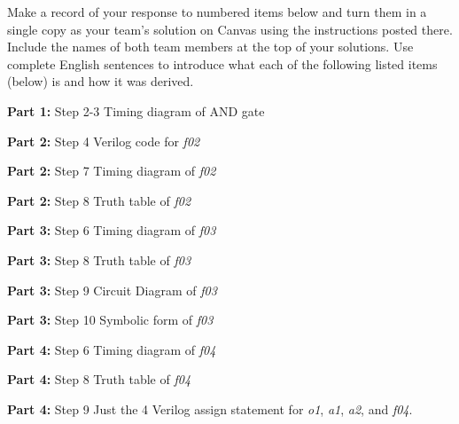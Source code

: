 \documentclass[
]{article}
\begin{document}
Make a record of your response to numbered items below and turn them in
a single copy as your team's solution on Canvas using the instructions
posted there. Include the names of both team members at the top of your
solutions. Use complete English sentences to introduce what each of the
following listed items (below) is and how it was derived.

\textbf{Part 1:} Step 2-3 Timing diagram of AND gate

\textbf{Part 2:} Step 4 Verilog code for \emph{f02}

\textbf{Part 2:} Step 7 Timing diagram of \emph{f02}

\textbf{Part 2:} Step 8 Truth table of \emph{f02}

\textbf{Part 3:} Step 6 Timing diagram of \emph{f03}

\textbf{Part 3:} Step 8 Truth table of \emph{f03}

\textbf{Part 3:} Step 9 Circuit Diagram of \emph{f03}

\textbf{Part 3:} Step 10 Symbolic form of \emph{f03}

\textbf{Part 4:} Step 6 Timing diagram of \emph{f04}

\textbf{Part 4:} Step 8 Truth table of \emph{f04}

\textbf{Part 4:} Step 9 Just the 4 Verilog assign statement for
\emph{o1}, \emph{a1}, \emph{a2}, and \emph{f04}.
\end{document}
